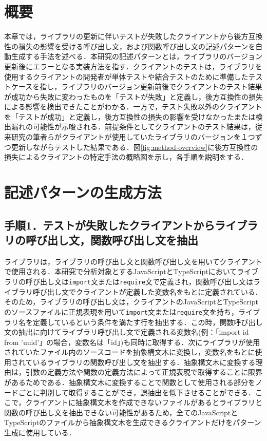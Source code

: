 \documentclass[11pt]{jreport}
\begin{document}
\section{概要}
本章では，ライブラリの更新に伴いテストが失敗したクライアントから後方互換性の損失の影響を受ける呼び出し文，および関数呼び出し文の記述パターンを自動生成する手法を述べる．本研究の記述パターンとは，ライブラリのバージョン更新後にエラーとなる実装方法を指す．クライアントのテストは，ライブラリを使用するクライアントの開発者が単体テストや結合テストのために準備したテストケースを指し，ライブラリのバージョン更新前後でクライアントのテスト結果が成功から失敗に変わったものを「テストが失敗」と定義し，後方互換性の損失による影響を検出できたことがわかる．一方で，テスト失敗以外のクライアントを「テストが成功」と定義し，後方互換性の損失の影響を受けなかったまたは検出漏れの可能性が示唆される．前提条件としてクライアントのテスト結果は，従来研究\cite{matsuda}の筆者らがクライアントが使用していたライブラリのバージョンを１つずつ更新しながらテストした結果である．図\ref{fig:method-overview}に後方互換性の損失によるクライアントの特定手法の概略図を示し，各手順を説明をする．

\section{記述パターンの生成方法}

\subsection{手順1．テストが失敗したクライアントからライブラリの呼び出し文，関数呼び出し文を抽出}
ライブラリは，ライブラリの呼び出し文と関数呼び出し文を用いてクライアントで使用される．本研究で分析対象とするJavaScriptとTypeScriptにおいてライブラリの呼び出し文は\texttt{import}文または\texttt{require}文で定義され，関数呼び出し文はライブラリ呼び出し文でクライアントが定義した変数名をもとに定義されている．そのため，ライブラリの呼び出し文は，クライアントのJavaScriptとTypeScriptのソースファイルに正規表現を用いて\texttt{import}文または\texttt{require}文を持ち，ライブラリ名を定義しているという条件を満たす行を抽出する．この時，関数呼び出し文の抽出に向けてライブラリ呼び出し文で定義される変数名(例：「import id from 'uuid'」の場合，変数名は「id」)も同時に取得する．次にライブラリが使用されていたファイル内のソースコードを抽象構文木に変換し，変数名をもとに使用されているライブラリの関数呼び出し文を抽出する．抽象構文木に変換する理由は，引数の定義方法や関数の定義方法によって正規表現で取得することに限界があるためである．抽象構文木に変換することで関数として使用される部分をノードごとに判別して取得することができ，誤抽出を低下させることができる．ここで，クライアントに抽象構文木を作成できないファイルがあるとライブラリと関数の呼び出し文を抽出できない可能性があるため，全てのJavaScriptとTypeScriptのファイルから抽象構文木を生成できるクライアントだけをパターン生成に使用している．
\end{document}
